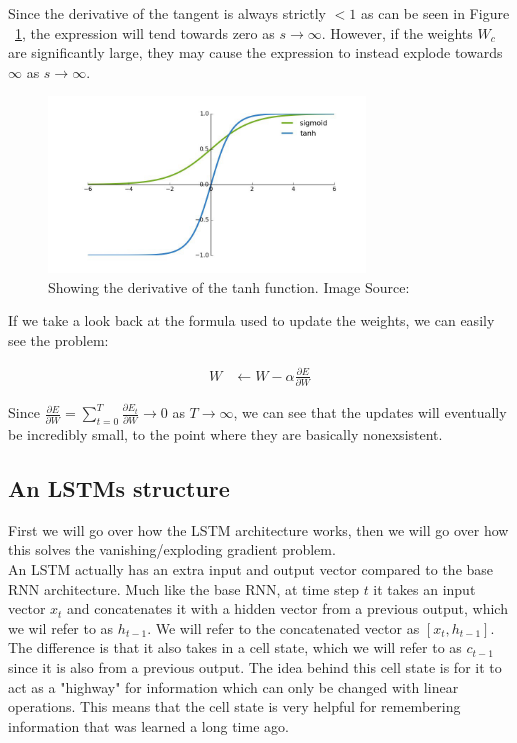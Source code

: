 \noindent
Since the derivative of the tangent is always strictly $<1$ as can be seen in Figure ~\ref{fig:tanh_deriv}, the expression will tend towards zero as $s \rightarrow \infty$. However, if the weights $W_c$ are significantly large, they may cause the expression to instead explode towards $\infty$ as $s \rightarrow \infty$.\\

\begin{figure}[h]
    \centering
        \includegraphics[width=0.75\textwidth]{latex/imgs/tanh_deriv.png}
    \caption{Showing the derivative of the tanh function. Image Source:\cite{grad}}
    \label{fig:tanh_deriv}
\end{figure}

\noindent
If we take a look back at the formula used to update the weights, we can easily see the problem:

\begin{align}
    W &\leftarrow W - \alpha \frac{\partial E}{\partial W}
\end{align}

\noindent
Since $\frac{\partial E}{\partial W} = \sum_{t=0}^{T} \frac{\partial E_t}{\partial W} \rightarrow 0$ as $T \rightarrow \infty$, we can see that the updates will eventually be incredibly small, to the point where they are basically nonexsistent.

\subsection{An LSTMs structure}
First we will go over how the LSTM architecture works, then we will go over how this solves the vanishing/exploding gradient problem.\\

\noindent
An LSTM actually has an extra input and output vector compared to the base RNN architecture. Much like the base RNN, at time step $t$ it takes an input vector $x_t$ and concatenates it with a hidden vector from a previous output, which we wil refer to as $h_{t-1}$. We will refer to the concatenated vector as $[x_t,h_{t-1}]$. The difference is that it also takes in a cell state, which we will refer to as $c_{t-1}$ since it is also from a previous output. The idea behind this cell state is for it to act as a "highway" for information which can only be changed with linear operations. This means that the cell state is very helpful for remembering information that was learned a long time ago.\\


